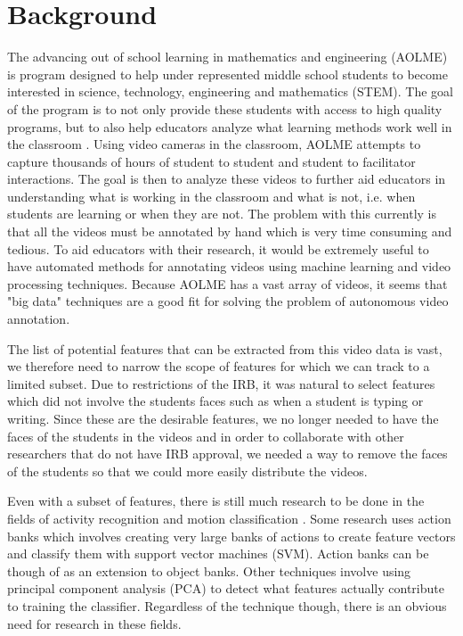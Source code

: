 \documentclass[
	submission,
	final,
	notitlepage,
	narroweqnarray,
	inline,
	twoside,
	]{ieee}
\begin{document}
\section{Background}
\PARstart The advancing out of school learning in mathematics and engineering (AOLME) is program designed to help under 
represented middle school students to become interested in science, technology, engineering and mathematics (STEM). The goal of
the program is to not only provide these students with access to high quality programs, but to also help educators analyze
what learning methods work well in the classroom \cite{aolme_paper}. Using video cameras in the classroom, AOLME attempts to capture 
thousands of hours of student to student and student to facilitator interactions. The goal is then to analyze these videos
to further aid educators in understanding what is working in the classroom and what is not, i.e. when students are learning or when they are not. 
The problem with this currently is that
all the videos must be annotated by hand which is very time consuming and tedious. To aid educators with their research, 
it would be extremely useful to have automated methods for annotating videos using machine learning and 
video processing techniques. Because AOLME has a vast array of videos, it seems that "big data" techniques are a
good fit for solving the problem of autonomous video annotation.

The list of potential features that can be extracted from this video data is vast, we
therefore need to narrow the scope of features for
which we can track to a limited subset. Due to restrictions of the IRB, 
it was natural to select features which did not involve the students faces
such as when a student is typing or writing. Since these are the desirable 
features, we no longer needed to have the faces of the students in the videos
and in order to collaborate with other researchers that do not have IRB
approval, we needed a way to remove the faces of the students so that
we could more easily distribute the videos. 

Even with a subset of features, there is still much research to be done
in the fields of activity recognition and motion classification \cite{machine_perception}.
Some research uses action banks \cite{action_bank} which involves
creating very large banks of actions to create feature vectors 
and classify them with support vector machines (SVM). Action banks
can be though of as an extension to object banks. Other techniques involve 
using principal component analysis (PCA) \cite{face_recog_book} to 
detect what features actually contribute to training the classifier.
Regardless of the technique though, there is an obvious need for
research in these fields.
\end{document}
